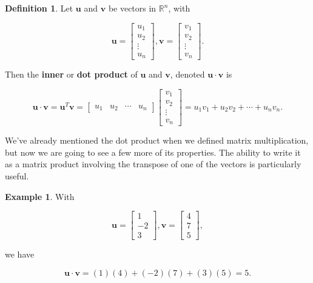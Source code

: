 \documentclass[
]{book}
\theoremstyle{definition}
\newtheorem{definition}{Definition}[chapter]
\theoremstyle{definition}
\newtheorem{example}{Example}[chapter]
\theoremstyle{definition}
\theoremstyle{definition}
\theoremstyle{remark}
\begin{document}
\begin{defbox}

\begin{definition}
Let \(\mathbf{u}\) and \(\mathbf{v}\) be vectors in \(\mathbb{R}^n\), with

\[\mathbf{u}=\begin{bmatrix}u_1\\u_2\\\vdots\\u_n\end{bmatrix},\mathbf{v}=\begin{bmatrix}v_1\\v_2\\\vdots\\v_n\end{bmatrix}.\]

Then the \textbf{inner} or \textbf{dot product} of \(\mathbf{u}\) and \(\mathbf{v}\), denoted \(\mathbf{u}\cdot\mathbf{v}\) is

\[\mathbf{u}\cdot\mathbf{v}=\mathbf{u}^T\mathbf{v}=\begin{bmatrix}u_1 & u_2 & \cdots & u_n\end{bmatrix}\begin{bmatrix}v_1\\v_2\\\vdots\\v_n\end{bmatrix}=u_1v_1+u_2v_2+\cdots+u_nv_n.\]
\end{definition}

\end{defbox}

We've already mentioned the dot product when we defined matrix multiplication, but now we are going to see a few more of its properties. The ability to write it as a matrix product involving the transpose of one of the vectors is particularly useful.

\pagebreak

\begin{examplebox}

\begin{example}
With

\[\mathbf{u}=\begin{bmatrix}1\\-2\\3\end{bmatrix},\mathbf{v}=\begin{bmatrix}4\\7\\5\end{bmatrix},\]

we have

\[\mathbf{u}\cdot\mathbf{v}=(1)(4)+(-2)(7)+(3)(5)=5.\]
\end{example}

\end{examplebox}
\end{document}
